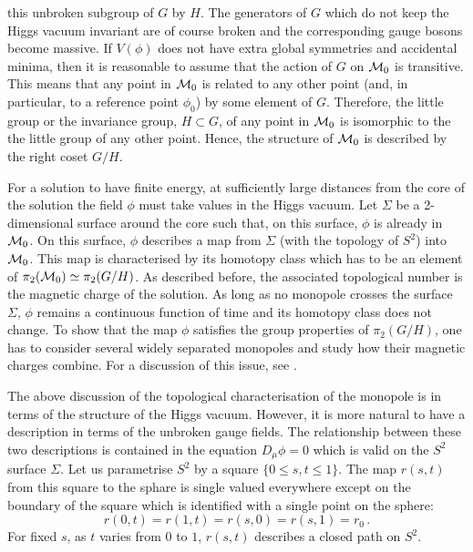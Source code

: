 this unbroken subgroup of $G$ by $H$. The generators of $G$ which do
not keep the Higgs vacuum invariant are of course broken and the
corresponding gauge bosons become massive.  If $V(\phi)$ does not have
extra global symmetries and accidental minima, then it is reasonable
to assume that the action of $G$ on ${\cal M}_0$ is transitive. This
means that any point in ${\cal M}_0$ is related to any other point
(and, in particular, to a reference point $\phi_0$) by some element of
$G$. Therefore, the little group or the invariance group, $H\subset
G$, of any point in ${\cal M}_0$ is isomorphic to the the little group
of any other point. Hence, the structure of ${\cal M}_0$ is described
by the right coset $G/H$.

For a solution  to have finite energy, at sufficiently large distances
from the core of the solution the field $\phi$ must take values in
the Higgs vacuum. Let $\Sigma$ be a 2-dimensional surface around the
core such that, on this surface, $\phi$ is already in ${\cal M}_0$. 
On this surface, $\phi$ describes a map from $\Sigma$ (with the
topology of $S^2$) into ${\cal M}_0$. This map is characterised by its
homotopy class which has to be an element of $\pi_2({\cal M}_0)\simeq
\pi_2(G/H)$. As described before, the associated topological number is
the magnetic charge of the solution. As long as no monopole crosses
the surface $\Sigma$, $\phi$ remains a continuous function of time and its
homotopy class does 
not change. To show that the map $\phi$ satisfies the group properties
of $\pi_2(G/H)$, one has to consider several widely separated
monopoles and study how their magnetic charges combine. For a
discussion of this issue, see \cite{coleman1}. 

The above discussion of the topological characterisation of the
monopole is in terms of the structure of the Higgs vacuum. However, it
is more natural to have a description in terms of the unbroken gauge
fields. The relationship  between these two descriptions is contained
in the equation $D_\mu\phi =0$ which is valid on the $S^2$ surface
$\Sigma$. Let us parametrise $S^2$ by a square $\{ 0 \leq s, t \leq 1
\}$. The map $r(s,t)$ from this square to the sphare is single valued
everywhere except on the boundary of the square which is identified
with a single point on the sphere: 
$$
r(0,t) = r(1,t) =r(s,0) =r(s,1) = r_0\,.
$$
For fixed $s$, as $t$ varies from $0$ to $1$, $r(s,t)$ describes a
closed path on $S^2$. 

